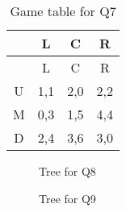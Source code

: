 \documentclass[
  12pt,
  letterpaper,
  DIV=11,
  numbers=noendperiod]{scrartcl}
\begin{document}
\begin{longtable}[]{@{}cccc@{}}
\caption{Game table for Q7}\label{tbl-dom}\tabularnewline
\toprule\noalign{}
& L & C & R \\
\midrule\noalign{}
\endfirsthead
\toprule\noalign{}
& L & C & R \\
\midrule\noalign{}
\endhead
\bottomrule\noalign{}
\endlastfoot
U & 1,1 & 2,0 & 2,2 \\
M & 0,3 & 1,5 & 4,4 \\
D & 2,4 & 3,6 & 3,0 \\
\end{longtable}

\begin{figure}


\caption{\label{fig-back}Tree for Q8}

\end{figure}%

\begin{figure}


\caption{\label{fig-signal}Tree for Q9}

\end{figure}%
\end{document}
